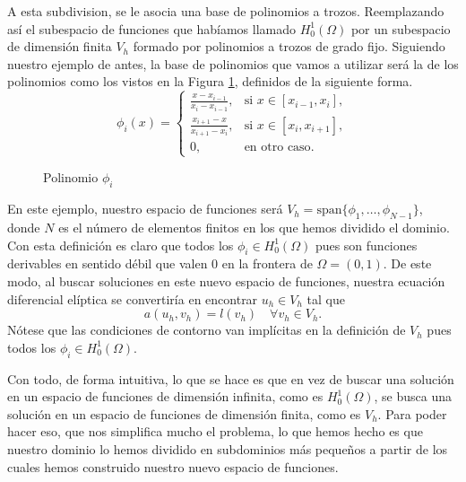 \documentclass[a4paper,11pt,spanish, twoside, leqno]{tfg-uam}
\theoremstyle{definition}
\begin{document}
A esta subdivision, se le asocia una base de polinomios a trozos. Reemplazando así el subespacio de funciones que habíamos llamado $H_0^1(\Omega)$ por un subespacio de dimensión finita $V_h$ formado por polinomios a trozos  de grado fijo. Siguiendo nuestro ejemplo de antes, la base de polinomios que vamos a utilizar será la de los polinomios como los vistos en la Figura \ref{fig:BasePolinomios}, definidos de la siguiente forma.
\begin{equation*}
    \phi_i(x) = \begin{cases}
        \frac{x-x_{i-1}}{x_i-x_{i-1}}, & \text{si } x\in[x_{i-1},x_i],\\
        \frac{x_{i+1}-x}{x_{i+1}-x_i}, & \text{si } x\in[x_i,x_{i+1}],\\
        0, & \text{en otro caso}.
    \end{cases} 
\end{equation*}

\begin{figure}
    \centering
    \caption{Polinomio $\phi_i$}
    \label{fig:BasePolinomios}
\end{figure}

En este ejemplo, nuestro espacio de funciones será $V_h = \text{span}\{\phi_1,\dots,\phi_{N-1}\}$, donde $N$ es el número de elementos finitos en los que hemos dividido el dominio. Con esta definición es claro que todos los $\phi_i\in H_0^1(\Omega)$ pues son funciones derivables en sentido débil que valen $0$ en la frontera de $\Omega =(0,1)$. De este modo, al buscar soluciones en este nuevo espacio de funciones, nuestra ecuación diferencial elíptica se convertiría en encontrar $u_h\in V_h$ tal que
\begin{equation*}
    a(u_h,v_h) = l(v_h) \quad \forall v_h\in V_h.
\end{equation*}
Nótese que las condiciones de contorno van implícitas en la definición de $V_h$ pues todos los $\phi_i\in H_0^1(\Omega)$. 

Con todo, de forma intuitiva, lo que se hace es que en vez de buscar una solución en un espacio de funciones de dimensión infinita, como es $H_0^1(\Omega)$, se busca una solución en un espacio de funciones de dimensión finita, como es $V_h$. Para poder hacer eso, que nos simplifica mucho el problema, lo que hemos hecho es que nuestro dominio lo hemos dividido en subdominios más pequeños a partir de los cuales hemos construido nuestro nuevo espacio de funciones. 
\end{document}
